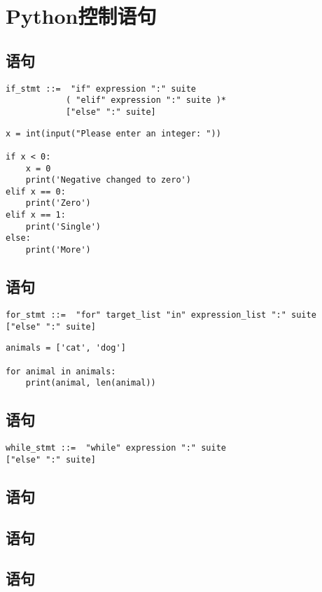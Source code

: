 \chapter{Python控制语句}

\section{语句}

\begin{verbatim}
if_stmt ::=  "if" expression ":" suite
			( "elif" expression ":" suite )*
			["else" ":" suite]
\end{verbatim}

\begin{lstlisting}[style=mypythonBlockStyle]
x = int(input("Please enter an integer: "))

if x < 0:
	x = 0
	print('Negative changed to zero')
elif x == 0:
	print('Zero')
elif x == 1:
	print('Single')
else:
	print('More')
\end{lstlisting}

\section{语句}

\begin{verbatim}
for_stmt ::=  "for" target_list "in" expression_list ":" suite
["else" ":" suite]
\end{verbatim}

\begin{lstlisting}[style=mypythonBlockStyle]
animals = ['cat', 'dog']

for animal in animals:
	print(animal, len(animal))
\end{lstlisting}

\section{语句}

\begin{verbatim}
while_stmt ::=  "while" expression ":" suite
["else" ":" suite]
\end{verbatim}

\section{语句}

\section{语句}

\section{语句}